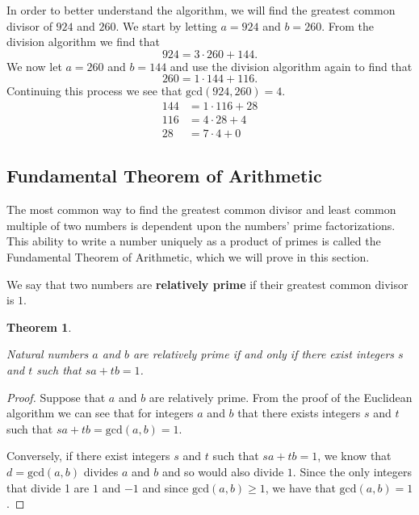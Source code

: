 \documentclass[
]{book}
\newtheorem{theorem}{Theorem}[chapter]
\theoremstyle{definition}
\theoremstyle{definition}
\theoremstyle{definition}
\theoremstyle{definition}
\theoremstyle{remark}
\begin{document}
In order to better understand the algorithm, we will find the greatest common divisor of \(924\) and \(260\). We start by letting \(a=924\) and \(b=260\). From the division algorithm we find that
\[924 = 3 \cdot 260+144.\] We now let \(a=260\) and \(b=144\) and use the division algorithm again to find that \[260=1\cdot 144 + 116.\] Continuing this process we see that \(\mathrm{gcd}(924,260)=4\).
\begin{align*}
144 &=1\cdot 116 + 28 \\
116 &= 4 \cdot 28 + 4 \\
28 &= 7\cdot 4 + 0 
\end{align*}

\hypertarget{fundamental-theorem-of-arithmetic}{%
\subsection{Fundamental Theorem of Arithmetic}\label{fundamental-theorem-of-arithmetic}}

The most common way to find the greatest common divisor and least common multiple of two numbers is dependent upon the numbers' prime factorizations. This ability to write a number uniquely as a product of primes is called the Fundamental Theorem of Arithmetic, which we will prove in this section.

We say that two numbers are \textbf{relatively prime} if their greatest common divisor is \(1\).

\begin{theorem}
\protect\hypertarget{thm:relatively-prime}{}\label{thm:relatively-prime}

Natural numbers \(a\) and \(b\) are relatively prime if and only if there exist integers \(s\) and \(t\) such that \(sa+tb=1\).

\end{theorem}

\begin{proof}

Suppose that \(a\) and \(b\) are relatively prime. From the proof of the Euclidean algorithm we can see that for integers \(a\) and \(b\) that there exists integers \(s\) and \(t\) such that \(sa+tb=\mathrm{gcd}(a,b)=1\).

Conversely, if there exist integers \(s\) and \(t\) such that \(sa+tb=1\), we know that \(d=\mathrm{gcd}(a,b)\) divides \(a\) and \(b\) and so would also divide \(1\). Since the only integers that divide 1 are \(1\) and \(-1\) and since \(\mathrm{gcd}(a,b)\geq 1\), we have that \(\mathrm{gcd}(a,b)=1\).

\end{proof}
\end{document}
